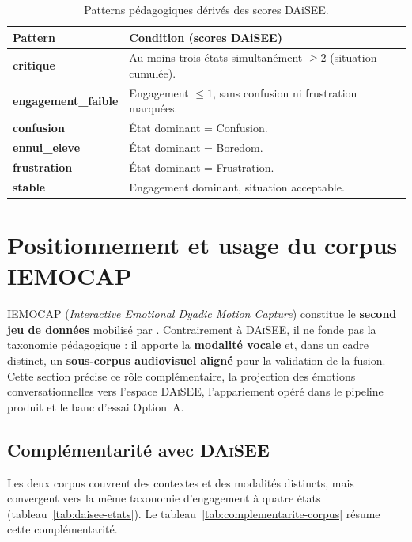 \begin{table}[H]
\centering
\renewcommand{\arraystretch}{1.2}
\begin{tabular}{>{\bfseries}l p{9.2cm}}
\toprule
Pattern & Condition (scores DAiSEE) \\
\midrule
critique          & Au moins trois états simultanément $\geq 2$ (situation cumulée). \\
engagement\_faible & Engagement $\leq 1$, sans confusion ni frustration marquées. \\
confusion         & État dominant = Confusion. \\
ennui\_eleve       & État dominant = Boredom. \\
frustration       & État dominant = Frustration. \\
stable            & Engagement dominant, situation acceptable. \\
\bottomrule
\end{tabular}
\caption{Patterns pédagogiques dérivés des scores DAiSEE.}
\label{tab:patterns}
\end{table}

\section{Positionnement et usage du corpus IEMOCAP}
\label{sec:iemocap}

\textsc{IEMOCAP} (\emph{Interactive Emotional Dyadic Motion Capture})
\cite{busso2008iemocap} constitue le \textbf{second jeu de données} mobilisé par
\emolearn{}. Contrairement à \textsc{DAiSEE}, il ne fonde pas la taxonomie
pédagogique : il apporte la \textbf{modalité vocale} et, dans un cadre distinct,
un \textbf{sous-corpus audiovisuel aligné} pour la validation de la fusion. Cette
section précise ce rôle complémentaire, la projection des émotions conversationnelles
vers l'espace \textsc{DAiSEE}, l'appariement opéré dans le pipeline produit et le
banc d'essai Option~A.

\subsection{Complémentarité avec \textsc{DAiSEE}}

Les deux corpus couvrent des contextes et des modalités distincts, mais convergent
vers la même taxonomie d'engagement à quatre états (tableau~\ref{tab:daisee-etats}).
Le tableau~\ref{tab:complementarite-corpus} résume cette complémentarité.

